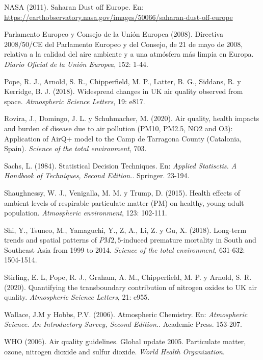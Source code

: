 \documentclass[12pt]{article}
\begin{document}
\begin{thebibliography}{99}
 NASA (2011). Saharan Dust off Europe. En: \href{https://earthobservatory.nasa.gov/images/50066/saharan-dust-off-europe}{https://earthobservatory.nasa.gov/images/50066/saharan-dust-off-europe}

 Parlamento Europeo y Consejo de la Unión Europea (2008). Directiva 2008/50/CE del Parlamento Europeo y del Consejo, de 21 de mayo de 2008, relativa a la calidad del aire ambiente y a una atmósfera más limpia en Europa. \textit{Diario Oficial de la Unión Europea}, 152: 1-44.

 Pope, R. J., Arnold, S. R., Chipperfield, M. P., Latter, B. G., Siddans, R. y Kerridge, B. J. (2018). Widespread changes in UK air quality observed from space. \textit{Atmospheric Science Letters}, 19: e817.

 Rovira, J., Domingo, J. L. y Schuhmacher, M. (2020). Air quality, health impacts and burden of disease due to air pollution (PM10, PM2.5, NO2 and O3): Application of AirQ+ model to the Camp de Tarragona County (Catalonia, Spain). \textit{Science of the total environment}, 703.

 Sachs, L. (1984). Statistical Decision Techniques. En: \textit{Applied Statisctis. A Handbook of Techniques, Second Edition.}. Springer. 23-194.

 Shaughnessy, W. J., Venigalla, M. M. y Trump, D. (2015). Health effects of ambient levels of respirable particulate matter (PM) on healthy, young-adult population. \textit{Atmospheric environment}, 123: 102-111.

 Shi, Y., Tsuneo, M., Yamaguchi, Y., Z, A., Li, Z. y Gu, X. (2018). Long-term trends and spatial patterns of $PM{2,5}$-induced premature mortality in South and Southeast Asia from 1999 to 2014. \textit{Science of the total environment}, 631-632: 1504-1514.

 Stirling, E. L, Pope, R. J., Graham, A. M., Chipperfield, M. P. y Arnold, S. R. (2020). Quantifying the transboundary contribution of nitrogen oxides to UK air quality. \textit{Atmospheric Science Letters}, 21: e955.

 Wallace, J.M y Hobbs, P.V. (2006). Atmospheric Chemistry. En: \textit{Atmospheric Science. An Introductory Survey, Second Edition.}. Academic Press. 153-207.

 WHO (2006). Air quality guidelines. Global update 2005. Particulate matter, ozone, nitrogen dioxide and sulfur dioxide. \textit{World Health Organization}.


\end{thebibliography}
\end{document}
